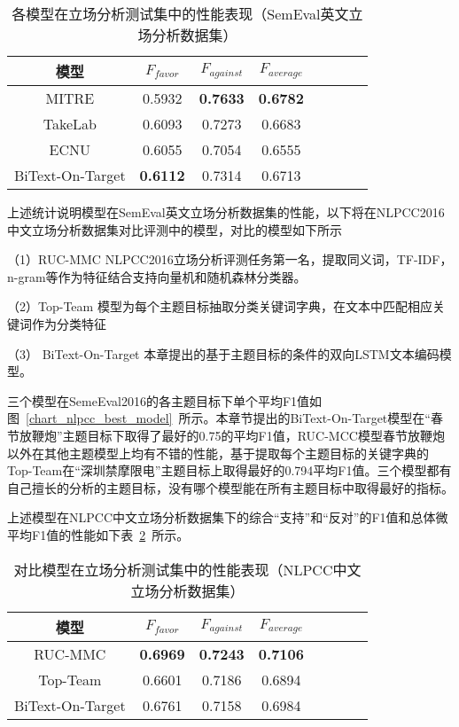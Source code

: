 \begin{table}[htbp]
	\caption[table123]{各模型在立场分析测试集中的性能表现（SemEval英文立场分析数据集）}
	\vspace{0.5em}\centering\wuhao
	\label{semeval_res}
	\begin{tabular}{cccccccc}
		\toprule[1.5pt]
		模型& $F_{favor}$&$F_{against}$&$F_{average}$ \\
		\midrule[1pt]
		MITRE\citeup{zarrella2016mitre}&0.5932&\textbf{0.7633}&\textbf{0.6782}\\
		TakeLab\citeup{tutek2016takelab} &0.6093&0.7273&0.6683\\
		ECNU\citeup{zhang2016ecnu}&0.6055&0.7054&0.6555\\
		BiText-On-Target&\textbf{0.6112}&0.7314&0.6713\\
		\bottomrule[1.5pt]
	\end{tabular}
\end{table}



上述统计说明模型在SemEval英文立场分析数据集的性能，以下将在NLPCC2016中文立场分析数据集对比评测中的模型，对比的模型如下所示

（1）RUC-MMC NLPCC2016立场分析评测任务第一名，提取同义词，TF-IDF，n-gram等作为特征结合支持向量机和随机森林分类器。

（2）Top-Team 模型为每个主题目标抽取分类关键词字典，在文本中匹配相应关键词作为分类特征

（3） BiText-On-Target 本章提出的基于主题目标的条件的双向LSTM文本编码模型。

三个模型在SemeEval2016的各主题目标下单个平均F1值如图~\ref{chart_nlpcc_best_model}~所示。本章节提出的BiText-On-Target模型在“春节放鞭炮”主题目标下取得了最好的0.75的平均F1值，RUC-MCC模型春节放鞭炮以外在其他主题模型上均有不错的性能，基于提取每个主题目标的关键字典的Top-Team在“深圳禁摩限电”主题目标上取得最好的0.794平均F1值。三个模型都有自己擅长的分析的主题目标，没有哪个模型能在所有主题目标中取得最好的指标。

上述模型在NLPCC中文立场分析数据集下的综合“支持”和“反对”的F1值和总体微平均F1值的性能如下表~\ref{nlpcc_res}~所示。
\begin{table}[htbp]
	\caption[table123]{对比模型在立场分析测试集中的性能表现（NLPCC中文立场分析数据集）}
	\label{nlpcc_res}
	\vspace{0.5em}\centering\wuhao
	\begin{tabular}{cccccccc}
		\toprule[1.5pt]
		模型& $F_{favor}$&$F_{against}$&$F_{average}$ \\
		\midrule[1pt]
		RUC-MMC\citeup{xu2016overview}&\textbf{0.6969}&\textbf{0.7243}&\textbf{0.7106}\\
		Top-Team\citeup{xu2016overview}&0.6601&0.7186&0.6894\\
		BiText-On-Target&0.6761&0.7158&0.6984\\
		\bottomrule[1.5pt]
	\end{tabular}
\end{table}

